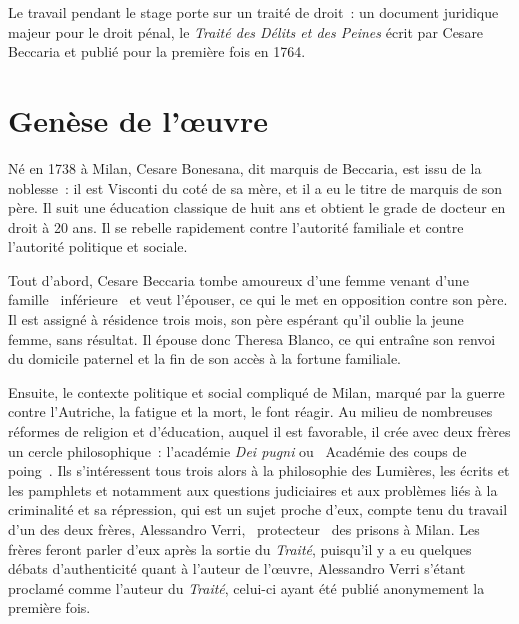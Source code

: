 
Le travail pendant le stage porte sur un traité de droit~: un document juridique majeur pour le droit pénal, le \emph{Traité des Délits et des Peines} écrit par Cesare Beccaria et publié pour la première fois en 1764.  

\section{Genèse de l'\oe{}uvre}
Né en 1738 à Milan, Cesare Bonesana, dit marquis de Beccaria, est issu de la noblesse~: il est Visconti du coté de sa mère, et il a eu le titre de marquis de son père. Il suit une éducation classique de huit ans et obtient le grade de docteur en droit à 20 ans. Il se rebelle rapidement contre l'autorité familiale et contre l'autorité politique et sociale.

Tout d'abord, Cesare Beccaria tombe amoureux d'une femme venant d'une famille \og~inférieure~\fg{} et veut l'épouser, ce qui le met en opposition contre son père. Il est assigné à résidence trois mois, son père espérant qu'il oublie la jeune femme, sans résultat. Il épouse donc Theresa Blanco, ce qui entraîne son renvoi du domicile paternel et la fin de son accès à la fortune familiale.

Ensuite, le contexte politique et social compliqué de Milan, marqué par la guerre contre l'Autriche, la fatigue et la mort, le font réagir. Au milieu de nombreuses réformes de religion et d'éducation, auquel il est favorable, il crée avec deux frères un cercle philosophique~: l'académie \emph{Dei pugni} ou \og~Académie des coups de poing~\fg{}. Ils s'intéressent tous trois alors à la philosophie des Lumières, les écrits et les pamphlets et notamment aux questions judiciaires et aux problèmes liés à la criminalité et sa répression, qui est un sujet proche d'eux, compte tenu du travail d'un des deux frères, Alessandro Verri, \og~protecteur~\fg{} des prisons à Milan. Les frères feront parler d'eux après la sortie du \emph{Traité}, puisqu'il y a eu quelques débats d'authenticité quant à l'auteur de l'œuvre, Alessandro Verri s'étant proclamé comme l'auteur du \emph{Traité}, celui-ci ayant été publié anonymement la première fois.

